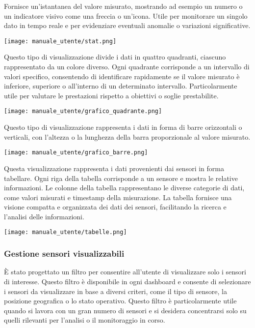 Fornisce un'istantanea del valore misurato, mostrando ad esempio un numero o un indicatore visivo come una freccia o un'icona. Utile per monitorare un singolo dato in tempo reale e per evidenziare eventuali anomalie o variazioni significative.
\begin{center}
    \texttt{[image: manuale\_utente/stat.png]}
\end{center} 

Questo tipo di visualizzazione divide i dati in quattro quadranti, ciascuno rappresentato da un colore diverso. Ogni quadrante corrisponde a un intervallo di valori specifico, consentendo di identificare rapidamente se il valore misurato è inferiore, superiore o all'interno di un determinato intervallo. Particolarmente utile per valutare le prestazioni rispetto a obiettivi o soglie prestabilite.
\begin{center}
    \texttt{[image: manuale\_utente/grafico\_quadrante.png]}
\end{center}

Questo tipo di visualizzazione rappresenta i dati in forma di barre orizzontali o verticali, con l'altezza o la lunghezza della barra proporzionale al valore misurato. 
\begin{center}
    \texttt{[image: manuale\_utente/grafico\_barre.png]}
\end{center}

Questa visualizzazione rappresenta i dati provenienti dai sensori in forma tabellare. Ogni riga della tabella corrisponde a un sensore e mostra le relative informazioni. Le colonne della tabella rappresentano le diverse categorie di dati, come valori misurati e timestamp della misurazione. La tabella fornisce una visione compatta e organizzata dei dati dei sensori, facilitando la ricerca e l'analisi delle informazioni.
\begin{center}
    \texttt{[image: manuale\_utente/tabelle.png]}
\end{center} 


\subsubsection{Gestione sensori visualizzabili}
È stato progettato un filtro per consentire all'utente di visualizzare solo i sensori di interesse. Questo filtro è disponibile in ogni dashboard e consente di selezionare i sensori da visualizzare in base a diversi criteri, come il tipo di sensore, la posizione geografica o lo stato operativo. Questo filtro è particolarmente utile quando si lavora con un gran numero di sensori e si desidera concentrarsi solo su quelli rilevanti per l'analisi o il monitoraggio in corso.


